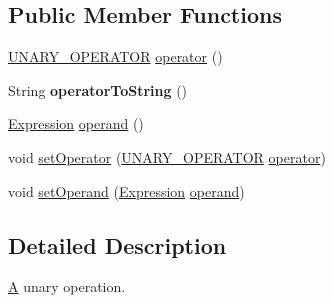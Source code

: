 \subsection*{Public Member Functions}
\begin{DoxyCompactItemize}
\item 
\hyperlink{enumedu_1_1udel_1_1cis_1_1vsl_1_1civl_1_1model_1_1IF_1_1expression_1_1UnaryExpression_1_1UNARY__OPERATOR}{U\+N\+A\+R\+Y\+\_\+\+O\+P\+E\+R\+A\+T\+O\+R} \hyperlink{interfaceedu_1_1udel_1_1cis_1_1vsl_1_1civl_1_1model_1_1IF_1_1expression_1_1UnaryExpression_af5c457322a6afa283614645971034a52}{operator} ()
\item 
\hypertarget{interfaceedu_1_1udel_1_1cis_1_1vsl_1_1civl_1_1model_1_1IF_1_1expression_1_1UnaryExpression_a79678de3039d74c3631f91fde3e8dcfd}{}String {\bfseries operator\+To\+String} ()\label{interfaceedu_1_1udel_1_1cis_1_1vsl_1_1civl_1_1model_1_1IF_1_1expression_1_1UnaryExpression_a79678de3039d74c3631f91fde3e8dcfd}

\item 
\hyperlink{interfaceedu_1_1udel_1_1cis_1_1vsl_1_1civl_1_1model_1_1IF_1_1expression_1_1Expression}{Expression} \hyperlink{interfaceedu_1_1udel_1_1cis_1_1vsl_1_1civl_1_1model_1_1IF_1_1expression_1_1UnaryExpression_a9e053a31285bd387e1e23cee7b95c990}{operand} ()
\item 
void \hyperlink{interfaceedu_1_1udel_1_1cis_1_1vsl_1_1civl_1_1model_1_1IF_1_1expression_1_1UnaryExpression_a37b78982ef45f8bf68adeb7a61f7400b}{set\+Operator} (\hyperlink{enumedu_1_1udel_1_1cis_1_1vsl_1_1civl_1_1model_1_1IF_1_1expression_1_1UnaryExpression_1_1UNARY__OPERATOR}{U\+N\+A\+R\+Y\+\_\+\+O\+P\+E\+R\+A\+T\+O\+R} \hyperlink{interfaceedu_1_1udel_1_1cis_1_1vsl_1_1civl_1_1model_1_1IF_1_1expression_1_1UnaryExpression_af5c457322a6afa283614645971034a52}{operator})
\item 
void \hyperlink{interfaceedu_1_1udel_1_1cis_1_1vsl_1_1civl_1_1model_1_1IF_1_1expression_1_1UnaryExpression_a9762ece88bef1683a1fb546371b3e28a}{set\+Operand} (\hyperlink{interfaceedu_1_1udel_1_1cis_1_1vsl_1_1civl_1_1model_1_1IF_1_1expression_1_1Expression}{Expression} \hyperlink{interfaceedu_1_1udel_1_1cis_1_1vsl_1_1civl_1_1model_1_1IF_1_1expression_1_1UnaryExpression_a9e053a31285bd387e1e23cee7b95c990}{operand})
\end{DoxyCompactItemize}


\subsection{Detailed Description}
\hyperlink{structA}{A} unary operation. 

